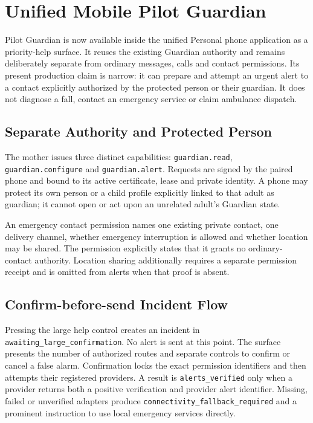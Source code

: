 \begingroup
\sloppy
\setlength{\emergencystretch}{3em}
\raggedright
\section{Unified Mobile Pilot Guardian}
\label{sec:pilot-unified-mobile-guardian}

Pilot Guardian is now available inside the unified Personal phone application as a priority-help
surface.  It reuses the existing Guardian authority and remains deliberately separate from ordinary
messages, calls and contact permissions.  Its present production claim is narrow: it can prepare
and attempt an urgent alert to a contact explicitly authorized by the protected person or their
guardian.  It does not diagnose a fall, contact an emergency service or claim ambulance dispatch.

\subsection{Separate Authority and Protected Person}

The mother issues three distinct capabilities: \texttt{guardian.read},
\texttt{guardian.configure} and \texttt{guardian.alert}.  Requests are signed by the paired phone
and bound to its active certificate, lease and private identity.  A phone may protect its own person
or a child profile explicitly linked to that adult as guardian; it cannot open or act upon an
unrelated adult's Guardian state.

An emergency contact permission names one existing private contact, one delivery channel, whether
emergency interruption is allowed and whether location may be shared.  The permission explicitly
states that it grants no ordinary-contact authority.  Location sharing additionally requires a
separate permission receipt and is omitted from alerts when that proof is absent.

\subsection{Confirm-before-send Incident Flow}

Pressing the large help control creates an incident in
\texttt{awaiting\_large\_confirmation}.  No alert is sent at this point.  The surface presents the
number of authorized routes and separate controls to confirm or cancel a false alarm.  Confirmation
locks the exact permission identifiers and then attempts their registered providers.  A result is
\texttt{alerts\_verified} only when a provider returns both a positive verification and provider
alert identifier.  Missing, failed or unverified adapters produce
\texttt{connectivity\_fallback\_required} and a prominent instruction to use local emergency
services directly.

